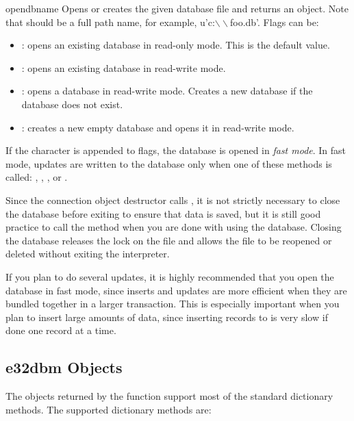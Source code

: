 \begin{funcdesc}{open}{dbname}
Opens or creates the given database file and returns an 
object.  Note that  should be a full path name, for
example, \textsf{u'c:$\backslash
\backslash $foo.db'}. Flags can be:

\begin{itemize}
\item {}: opens an existing database in read-only mode. This is the default value.
\item {}: opens an existing database in read-write mode.
\item {}: opens a database in read-write mode. Creates a new database if the database does not exist.
\item {}: creates a new empty database and opens it in read-write mode.
\end{itemize}

If the character  is appended to flags, the database is opened in \textit{fast mode}. In 
fast mode, updates are written to the database only when one of these 
methods is called: , , , or 
.
\end{funcdesc}

Since the connection object destructor calls , it is not 
strictly necessary to close the database before exiting to ensure that data 
is saved, but it is still good practice to call the  method 
when you are done with using the database. Closing the database releases the 
lock on the file and allows the file to be reopened or deleted without 
exiting the interpreter.

If you plan to do several updates, it is highly recommended that you open 
the database in fast mode, since inserts and updates are more efficient when 
they are bundled together in a larger transaction. This is especially 
important when you plan to insert large amounts of data, since inserting 
records to  is very slow if done one record at a time.

\subsection{e32dbm Objects}
The  objects returned by the  function support 
most of the standard dictionary methods. The supported dictionary methods 
are:

